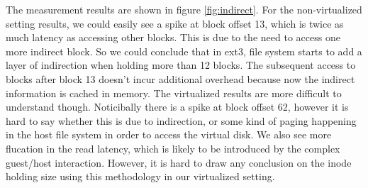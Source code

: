 The measurement results are shown in figure \ref{fig:indirect}. For the non-virtualized setting results, we could easily see a spike at block offset 13, which is twice as much latency as accessing other blocks. This is due to the need to access one more indirect block. So we could conclude that in ext3, file system starts to add a layer of indirection when holding more than 12 blocks. The subsequent access to blocks after block 13 doesn't incur additional overhead because now the indirect information is cached in memory. The virtualized results are more difficult to understand though. Noticibally there is a spike at block offset 62, however it is hard to say whether this is due to indirection, or some kind of paging happening in the host file system in order to access the virtual disk. We also see more flucation in the read latency, which is likely to be introduced by the complex guest/host interaction. However, it is hard to draw any conclusion on the inode holding size using this methodology in our virtualized setting. 
